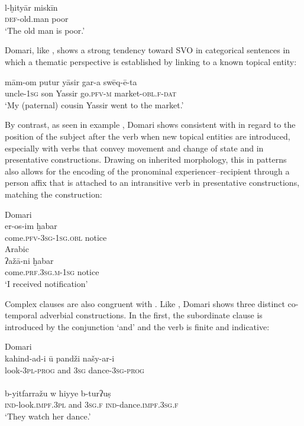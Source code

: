 \documentclass[output=paper]{langsci/langscibook}
\begin{document}
\\
\gll l-ḫityār miskīn  \\
     \textsc{def}{}-old.man poor\\
\glt ‘The old man is poor.’
\z
\z

Domari, like , shows a strong tendency toward SVO  in categorical sentences in which a thematic perspective is established by linking to a known topical entity:

\ea \gll mām-om putur yāsir gar-a swēq-ē-ta\\
         uncle-\textsc{1sg} son Yassir go.\textsc{pfv-m} market-\textsc{obl.f-dat}\\
\glt     ‘My (paternal) cousin Yassir went to the market.’
\z

By contrast, as seen in example , Domari shows consistent  with  in regard to the position of the subject after the verb when new topical entities are introduced, especially with verbs that convey movement and change of state and in presentative constructions. Drawing on inherited morphology, this  in  patterns also allows for the encoding of the pronominal experiencer--recipient through a person affix that is attached to an intransitive verb in presentative constructions, matching the  construction:



\ea
\ea
{Domari}\\
\gll er-os-im ḫabar    \\
     come.\textsc{pfv-3sg-1sg.obl}  notice\\
\ex
{Arabic}\\
\gll  ʔažā-ni  ḫabar  \\
     come.\textsc{prf.3sg.m-1sg} notice\\
\glt ‘I received notification’
\z
\z

Complex clauses are also congruent with . Like , Domari shows three distinct co-temporal adverbial constructions. In the first, the subordinate clause is introduced by the conjunction ‘and’ and the verb is finite and indicative:

\ea
\ea
{Domari}\\
\gll kahind-ad-i ū pandži našy-ar-i  \\
     look-\textsc{3pl-prog} and \textsc{3sg} dance-\textsc{3sg-prog}\\
     
\\
\gll b-yitfarražu w hiyye b-turʔuṣ  \\
     \textsc{ind}-look.\textsc{impf.3pl} and \textsc{3sg.f} \textsc{ind}-dance.\textsc{impf.3sg.f}\\
\glt ‘They watch her dance.’
\z
\z
\end{document}
